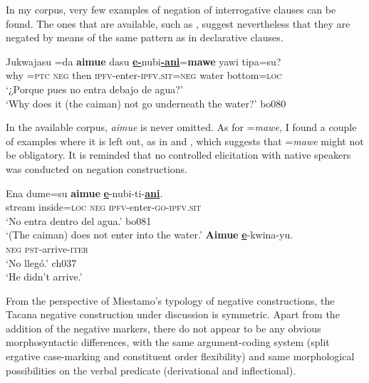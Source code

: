 \documentclass[output=paper]{langsci/langscibook}
\begin{document}
In my corpus, very few examples of negation of interrogative clauses can be
found. The ones that are available, such as , suggest
nevertheless that they are negated by means of the same pattern as in declarative clauses.
%
\begin{exe}\ex
\label{ex:tacana-caiman}  
\gll Jukwajasu  =da  \textbf{aimue}  dasu
\textbf{\underline{e-}}nubi\textbf{\underline{-ani}}=\textbf{mawe} {\ob}yawi
tipa=su{\cb}?\\
  why  =\textsc{ptc}  \textsc{neg}  then
  \textsc{ipfv}-enter-\textsc{ipfv.sit}=\textsc{neg}  water
  bottom=\textsc{loc}\\
\glt `¿Porque pues no entra debajo de agua?'\\
`Why does it (the caiman) not go underneath the water?' bo080
\end{exe}

In the available corpus, \textit{aimue} is never omitted. As for
=\textit{mawe,} I found a couple of examples where it is left out, as in
 and , which suggests
that =\textit{mawe} might not be obligatory. It is reminded that no
controlled elicitation with native speakers was conducted on negation
constructions.
%
\begin{exe}\ex\label{ex:tacana-caiman-second}
\gll {\ob}Ena  dume=su{\cb}  \textbf{aimue}
\textbf{\underline{e}}-nubi-ti-\textbf{\underline{ani}}.\\
    stream  inside=\textsc{loc}  \textsc{neg}
    \textsc{ipfv}-enter-\textsc{go-ipfv.sit}\\
\glt `No entra dentro del agua.' bo081\\
`(The caiman) does not enter into the water.'
\ex\label{ex:tacana-arrive} 
\gll \textbf{Aimue}  \textbf{\underline{e}}-kwina-yu.\\
  \textsc{neg}  \textsc{pst}-arrive-\textsc{iter}\\
\glt `No llegó.' ch037\\ 
`He didn't arrive.'
\end{exe}
%
From the perspective of Miestamo's \parencites*{Miestamo2005}{Miestamo2007} typology of negative constructions, the Tacana negative construction under discussion is symmetric. Apart from the addition of the negative markers, there do not appear to be any obvious morphosyntactic differences, with the same argument-coding system (split ergative case-marking and constituent order flexibility) and same morphological possibilities on the verbal predicate (derivational and inflectional). 
\end{document}
